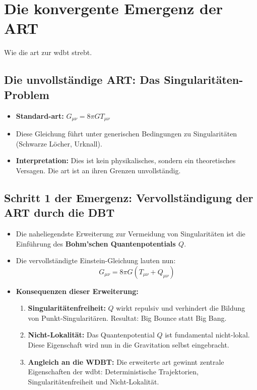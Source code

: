 \chapter{Die konvergente Emergenz der ART}
 Wie die \gls{art} zur \gls{wdbt} strebt.

\section{Die unvollständige ART: Das Singularitäten-Problem}

\begin{itemize}
    \item \textbf{Standard-\gls{art}:} $G_{\mu\nu} = 8\pi G T_{\mu\nu}$
    \item Diese Gleichung führt unter generischen Bedingungen zu Singularitäten (Schwarze Löcher, Urknall).
    \item \textbf{Interpretation:} Dies ist kein physikalisches, sondern ein theoretisches Versagen. Die \gls{art} ist an ihren Grenzen unvollständig.
\end{itemize}

\section{Schritt 1 der Emergenz: Vervollständigung der ART durch die DBT}

\begin{itemize}
    \item Die naheliegendste Erweiterung zur Vermeidung von Singularitäten ist die Einführung des \textbf{Bohm'schen Quantenpotentials $Q$}.
    \item Die vervollständigte Einstein-Gleichung lauten nun:
    \begin{equation}
        G_{\mu\nu} = 8\pi G (T_{\mu\nu} + Q_{\mu\nu})
    \end{equation}
    \item \textbf{Konsequenzen dieser Erweiterung:}
    \begin{enumerate}
        \item \textbf{Singularitätenfreiheit:} $Q$ wirkt repulsiv und verhindert die Bildung von Punkt-Singularitären. Resultat: Big Bounce statt Big Bang.
        \item \textbf{Nicht-Lokalität:} Das Quantenpotential $Q$ ist fundamental nicht-lokal. Diese Eigenschaft wird nun in die Gravitation selbst eingebracht.
        \item \textbf{Angleich an die WDBT:} Die erweiterte \gls{art} gewinnt zentrale Eigenschaften der \gls{wdbt}: Deterministische Trajektorien, Singularitätenfreiheit und Nicht-Lokalität.
    \end{enumerate}
\end{itemize}


